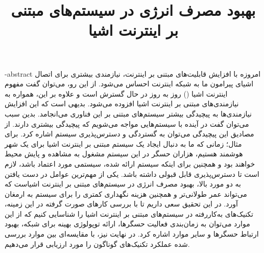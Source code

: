 \documentclass[oneside,openany,mscS]{SBU-Thesis}
\begin{document}
	\title{بهبود مصرف انرژی در سیستم‌های مبتنی بر اینترنت اشیا}
	
	\subject{مهندسی کامپیوتر}
	
	
	


	
	

	\fa-abstract{
امروزه با افزایش قابلیت‌های مبتنی بر اینترنت، نیازمندی بیشتری برای اتصال اشیای پیرامون ما به شبکه اینترنت احساس می‌شود. از این رو، می‌توان گفت مفهوم اینترنت اشیا () روز به روز در حال گسترش است و علاوه بر این، همواره به نیازمندی‌های مبتنی بر اینترنت اشیا افزوده می‌شود. بدیهی است که این افزایش نیازمندی‌ها به پیچیدگی بیشتر سیستم‌های مبتنی بر این فناوری می‌انجامد. بدین سبب می‌توان گفت در آینده با سیستم‌هایی مواجه می‌شویم که پیچیدگی بیشتری دارند. از مصادیق این پیچیدگی می‌توان به گستردگی و دسترس‌پذیری سیستم اشاره کرد. برای مثال؛ زمانی که ما به دنبال ایجاد یک سیستم مبتنی بر اینترنت اشیا برای یک شهر هوشمند هستیم، هزاران حسگر در این سیستم مشغول به مشاهده و پایش محیط خواهند بود و همچنین برای اینکه سیستم ارائه شده، سیستمی مورد اعتماد باشد، لازم است تا دسترس‌پذیری قابل قبولی داشته باشد. یکی از مهم‌ترین عوامل در دست یافتن به دو مورد بالا، بهبود مصرف انرژی در سیستم‌های مبتنی بر اینترنت اشیاست که می‌تواند عمر طولانی‌تر و همچنین هزینه نگهداری کمتری را برای سیستم به ارمغان آورد. در این تحقیق سعی داریم تا با بررسی کارهای صورت گرفته در این زمینه، تکنیک‌های به‌کاررفته در سیستم‌های مبتنی بر اینترنت اشیا را شناسایی کنیم که از این موارد می‌توان به زمان‌بندی فعالیت حسگرها، ارائه توپولوژی بهینه برای شبکه، بهبود ارتباط حسگرها و سایر موارد اشاره کرد. در نهایت نیز، با مقایسه‌ای بین موارد بررسی شده عملکرد تکنیک‌های گوناگون را مورد ارزیابی قرار می‌دهیم. 
	}

\firstPage
\abstractPage %


\tableofcontents %
\listoffigures \newpage %







	
\newpage

\end{document}
